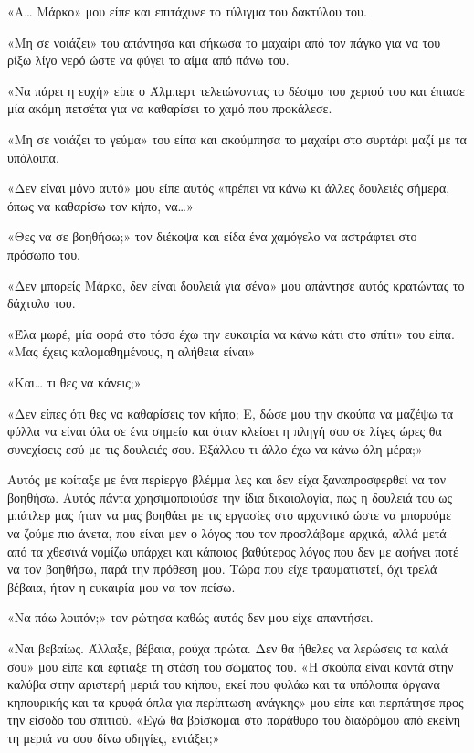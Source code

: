 \documentclass[12pt,twoside, openany]{book}
\begin{document}
«Α… Μάρκο» μου είπε και επιτάχυνε το τύλιγμα του δακτύλου του.

«Μη σε νοιάζει» του απάντησα και σήκωσα το μαχαίρι από τον πάγκο για να του ρίξω λίγο νερό ώστε να φύγει το αίμα από πάνω του.

«Να πάρει η ευχή» είπε ο Άλμπερτ τελειώνοντας το δέσιμο του χεριού του και έπιασε μία ακόμη πετσέτα για να καθαρίσει το χαμό που προκάλεσε.

«Μη σε νοιάζει το γεύμα» του είπα και ακούμπησα το μαχαίρι στο συρτάρι μαζί με τα υπόλοιπα.

«Δεν είναι μόνο αυτό» μου είπε αυτός «πρέπει να κάνω κι άλλες δουλειές σήμερα, όπως να καθαρίσω τον κήπο, να…»

«Θες να σε βοηθήσω;» τον διέκοψα και είδα ένα χαμόγελο να αστράφτει στο πρόσωπο του.

«Δεν μπορείς Μάρκο, δεν είναι δουλειά για σένα» μου απάντησε αυτός κρατώντας το δάχτυλο του.

«Έλα μωρέ, μία φορά στο τόσο έχω την ευκαιρία να κάνω κάτι στο σπίτι» του είπα. «Μας έχεις καλομαθημένους, η αλήθεια είναι»

«Και… τι θες να κάνεις;»

«Δεν είπες ότι θες να καθαρίσεις τον κήπο; Ε, δώσε μου την σκούπα να μαζέψω τα φύλλα να είναι όλα σε ένα σημείο και όταν κλείσει η πληγή σου σε λίγες ώρες θα συνεχίσεις εσύ με τις δουλειές σου. Εξάλλου τι άλλο έχω να κάνω όλη μέρα;»

Αυτός με κοίταξε με ένα περίεργο βλέμμα λες και δεν είχα ξαναπροσφερθεί να τον βοηθήσω. Αυτός πάντα χρησιμοποιούσε την ίδια δικαιολογία, πως η δουλειά του ως μπάτλερ μας ήταν να μας βοηθάει με τις εργασίες στο αρχοντικό ώστε να μπορούμε να ζούμε πιο άνετα, που είναι μεν ο λόγος που τον προσλάβαμε αρχικά, αλλά μετά από τα χθεσινά νομίζω υπάρχει και κάποιος βαθύτερος λόγος που δεν με αφήνει ποτέ να τον βοηθήσω, παρά την πρόθεση μου. Τώρα που είχε τραυματιστεί, όχι τρελά βέβαια, ήταν η ευκαιρία μου να τον πείσω.

«Να πάω λοιπόν;» τον ρώτησα καθώς αυτός δεν μου είχε απαντήσει.

«Ναι βεβαίως. Άλλαξε, βέβαια, ρούχα πρώτα. Δεν θα ήθελες να λερώσεις τα καλά σου» μου είπε και έφτιαξε τη στάση του σώματος του. «Η σκούπα είναι κοντά στην καλύβα στην αριστερή μεριά του κήπου, εκεί που φυλάω και τα υπόλοιπα όργανα κηπουρικής και τα κρυφά όπλα για περίπτωση ανάγκης» μου είπε και περπάτησε προς την είσοδο του σπιτιού. «Εγώ θα βρίσκομαι στο παράθυρο του διαδρόμου από εκείνη τη μεριά να σου δίνω οδηγίες, εντάξει;»
\end{document}
